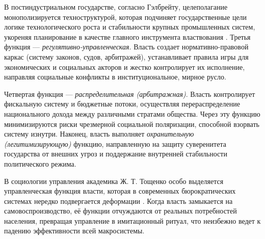 В постиндустриальном государстве, согласно Гэлбрейту, целеполагание монополизируется техноструктурой, которая подчиняет государственные цели логике технологического роста и стабильности крупных промышленных систем, укореняя планирование в качестве главного инструмента властвования \cite{Gelbreyt}. Третья функция — \textit{регулятивно-управленческая}. Власть создает нормативно-правовой каркас (систему законов, судов, арбитражей), устанавливает правила игры для экономических и социальных акторов и жестко контролирует их исполнение, направляя социальные конфликты в институциональное, мирное русло.

Четвертая функция — \textit{распределительная (арбитражная)}. Власть контролирует фискальную систему и бюджетные потоки, осуществляя перераспределение национального дохода между различными стратами общества. Через эту функцию минимизируются риски чрезмерной социальной поляризации, способной взорвать систему изнутри. Наконец, власть выполняет \textit{охранительную (легитимизирующую)} функцию, направленную на защиту суверенитета государства от внешних угроз и поддержание внутренней стабильности политического режима. 

В социологии управления академика Ж. Т. Тощенко особо выделяется управленческая функция власти, которая в современных бюрократических системах нередко подвергается деформации \cite{Toschenko}. Когда власть замыкается на самовоспроизводство, её функции отчуждаются от реальных потребностей населения, превращая управление в имитационный ритуал, что неизбежно ведет к падению эффективности всей макросистемы.